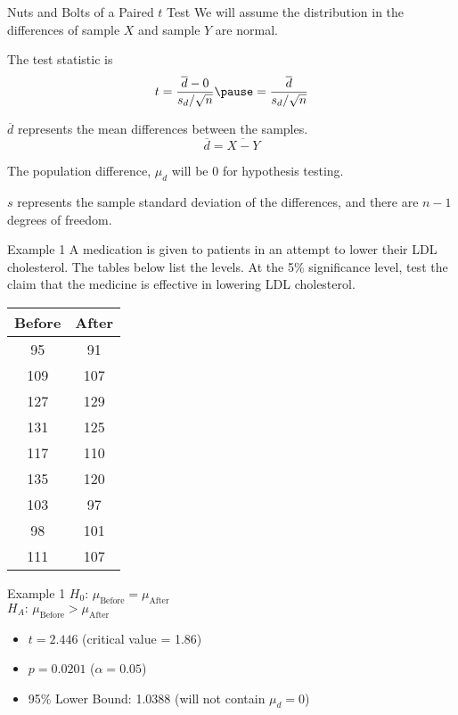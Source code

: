 \documentclass[t]{beamer}
\begin{document}
\begin{frame}{Nuts and Bolts of a Paired $t$ Test}
We will assume the distribution in the differences of sample $X$ and sample $Y$ are normal.	\newline\\	\pause

The test statistic is
\[t = \frac{\overline{d} - 0}{s_d / \sqrt{n}} \pause = 	\frac{\overline{d}}{s_d / \sqrt{n}} \]		\pause

$\overline{d}$ represents the mean differences between the samples. \[\overline{d} = \overline{X-Y}\]		\pause

The population difference, $\mu_d$ will be 0 for hypothesis testing.	\newline\\	\pause

$s$ represents the sample standard deviation of the differences, and there are $n-1$ degrees of freedom.
\end{frame}

\begin{frame}{Example 1}
A medication is given to patients in an attempt to lower their LDL cholesterol. The tables below list the levels. At the 5\% significance level, test the claim that the medicine is effective in lowering LDL cholesterol.	\newline\\
\begin{tabular}{c|c}
\textbf{Before} & \textbf{After} \\ \hline
95 & 91 \\
109 & 107 \\
127 & 129 \\
131 & 125 \\
117 & 110 \\
135 & 120 \\
103 & 97 \\
98 & 101 \\
111 & 107 \\
\end{tabular}
\end{frame}

\begin{frame}{Example 1}
$H_0: \, \mu_{\text{Before}} = \mu_{\text{After}}$	\newline\\
$H_A: \, \mu_{\text{Before}} > \mu_{\text{After}}$	\newline\\	\pause
\begin{itemize}
	\item $t = 2.446$ \quad \pause (critical value = 1.86)	\newline\\	\pause
	\item $p = 0.0201$ \quad \pause ($\alpha = 0.05$) \newline\\	\pause
	\item 95\% Lower Bound: 1.0388 \quad \pause (will not contain $\mu_d = 0$)
\end{itemize}
\end{frame}
\end{document}
